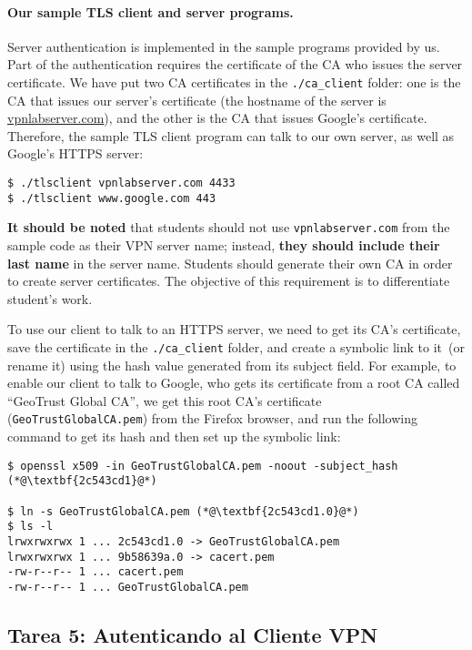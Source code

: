 \paragraph{Our sample TLS client and server programs.} Server authentication
is implemented in the sample programs provided by us. Part of the authentication requires the
certificate of the CA who issues the server certificate. 
We have put two CA certificates in the \texttt{./ca\_client} folder: one is the 
CA that issues our server's certificate (the hostname of the server
is \url{vpnlabserver.com}), 
and the other is the CA that issues Google's certificate. 
Therefore, the sample TLS client program can talk to 
our own server, as well as Google's HTTPS server: 

\begin{lstlisting}
$ ./tlsclient vpnlabserver.com 4433
$ ./tlsclient www.google.com 443
\end{lstlisting}


\textbf{It should be noted} that students should not use 
\texttt{vpnlabserver.com} from the sample code as their VPN server name;
instead, \textbf{they should include their last name} in the server 
name. Students should generate their own CA in order to create 
server certificates. The objective of this requirement is to differentiate
student's work.


To use our client to talk to an HTTPS server, we need to get its CA's certificate, 
save the certificate in the \texttt{./ca\_client} folder, and create a symbolic link to it~(or
rename it) using the hash value generated from its subject field.
For example, to enable our client to talk to Google, who gets 
its certificate from a root CA called ``GeoTrust Global CA'', we
get this root CA's certificate (\texttt{GeoTrustGlobalCA.pem})  
from the Firefox browser,
and run the following command to get its hash and then set up the symbolic link:

\begin{lstlisting}
$ openssl x509 -in GeoTrustGlobalCA.pem -noout -subject_hash
(*@\textbf{2c543cd1}@*)

$ ln -s GeoTrustGlobalCA.pem (*@\textbf{2c543cd1.0}@*)
$ ls -l
lrwxrwxrwx 1 ... 2c543cd1.0 -> GeoTrustGlobalCA.pem
lrwxrwxrwx 1 ... 9b58639a.0 -> cacert.pem
-rw-r--r-- 1 ... cacert.pem
-rw-r--r-- 1 ... GeoTrustGlobalCA.pem
\end{lstlisting}


\subsection{Tarea 5: Autenticando al Cliente VPN}

